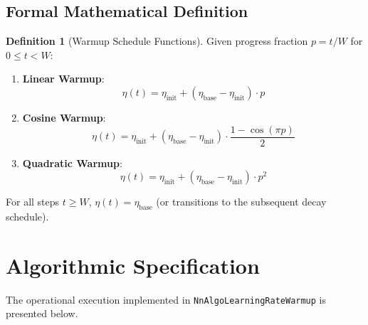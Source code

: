 \documentclass[11pt,a4paper]{article}
\theoremstyle{definition}
\newtheorem{definition}{Definition}[section]
\begin{document}
\subsection{Formal Mathematical Definition}
\begin{definition}[Warmup Schedule Functions]
Given progress fraction $p = t / W$ for $0 \le t < W$:
\begin{enumerate}
    \item \textbf{Linear Warmup}:
    \begin{equation}
    \eta(t) = \eta_{\text{init}} + (\eta_{\text{base}} - \eta_{\text{init}}) \cdot p \label{eq:linear_warmup}
    \end{equation}
    \item \textbf{Cosine Warmup}:
    \begin{equation}
    \eta(t) = \eta_{\text{init}} + (\eta_{\text{base}} - \eta_{\text{init}}) \cdot \frac{1 - \cos(\pi p)}{2} \label{eq:cosine_warmup}
    \end{equation}
    \item \textbf{Quadratic Warmup}:
    \begin{equation}
    \eta(t) = \eta_{\text{init}} + (\eta_{\text{base}} - \eta_{\text{init}}) \cdot p^2 \label{eq:quad_warmup}
    \end{equation}
\end{enumerate}
For all steps $t \ge W$, $\eta(t) = \eta_{\text{base}}$ (or transitions to the subsequent decay schedule).
\end{definition}

\section{Algorithmic Specification}

The operational execution implemented in \texttt{NnAlgoLearningRateWarmup} is presented below.
\end{document}
